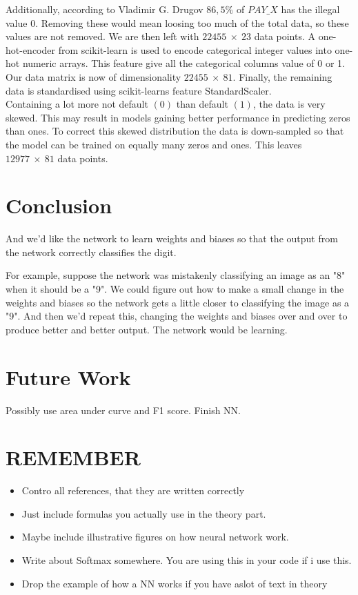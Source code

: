 \documentclass[a4paper,11pt,twocolumn]{article}
\begin{document}
Additionally, according to Vladimir G. Drugov \cite{vladimir} $86,5 \%$ of $PAY\_X$ has the illegal value 0. 
Removing these would mean loosing too much of the total data, so these values are not removed. We are then left with $22455\: \times\: 23$ data points.
A one-hot-encoder from scikit-learn is used to encode categorical integer values into one-hot numeric arrays. This feature give all the categorical columns value of 0 or 1. Our data matrix is now of dimensionality $22455\: \times\: 81$. Finally, the remaining data is standardised using scikit-learns feature StandardScaler. 
\\ 
Containing a lot more not default $(0)$ than default $(1)$, the data is very skewed. This may result in models gaining better performance in predicting zeros than ones. To correct this skewed distribution the data is down-sampled so that the model can be trained on equally many zeros and ones. This leaves $12977\: \times\: 81$ data points. 

\section{Conclusion}

And we'd like the network to learn weights and biases so that the output from the network correctly classifies the digit.

For example, suppose the network was mistakenly classifying an image as an "8" when it should be a "9". We could figure out how to make a small change in the weights and biases so the network gets a little closer to classifying the image as a "9". And then we'd repeat this, changing the weights and biases over and over to produce better and better output. The network would be learning.

\section{Future Work}
Possibly use area under curve and F1 score. Finish NN. 

\section{REMEMBER}
\begin{itemize}
\item Contro all references, that they are written correctly 
\item Just include formulas you actually use in the theory part.
\item Maybe include illustrative figures on how neural network work.
\item Write about Softmax somewhere. You are using this in your code if i use this. 
\item Drop the example of how a NN works if you have aslot of text in theory
\end{itemize}
\end{document}
